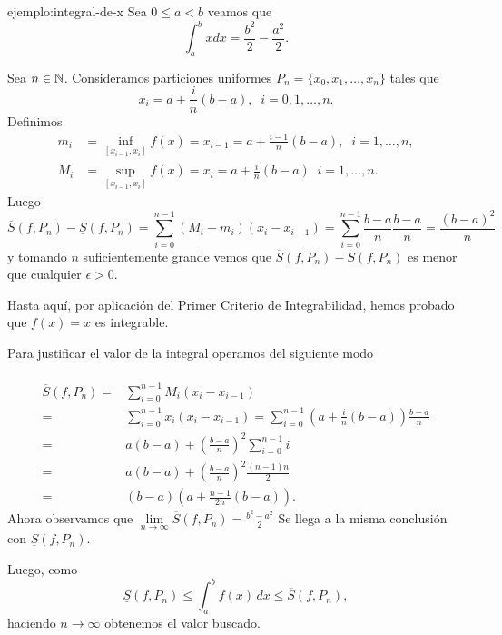 \begin{ejemplo}{ejemplo:integral-de-x} Sea $0\leq a<b$ veamos que 
\[
 \int_a^b x dx=\frac{b^2}{2}-\frac{a^2}{2}.
\]
\begin{demo}
Sea $n \in \mathbb{N}$.
Consideramos particiones uniformes $P_n=\{x_0,x_1,\ldots,x_n\}$ tales que
\[x_i=a+\frac{i}{n}(b-a),\;\;  i=0,1,\ldots,n.\]
Definimos
\[\begin{split}
m_i&=\inf\limits_{[x_{i-1},x_i]}f(x)=x_{i-1}=a+\frac{i-1}{n}(b-a),\;\;  i=1,\ldots,n,
\\
M_i&=\sup\limits_{[x_{i-1},x_i]}f(x)=x_{i}=a+\frac{i}{n}(b-a)\;\;  i=1,\ldots,n.
\end{split}\]
Luego
\[
\overline{S}(f,P_n)-\underline{S}(f,P_n)=
\sum\limits_{i=0}^{n-1} (M_i-m_i)(x_i-x_{i-1})=
\sum\limits_{i=0}^{n-1}  
\frac{b-a}{n}\frac{b-a}{n}=\frac{(b-a)^2}{n}
\]
y tomando $n$ suficientemente grande vemos que $\overline{S}(f,P_n)-\underline{S}(f,P_n)$ es menor que cualquier $\epsilon>0$.

Hasta aqu\'i, por aplicaci\'on del Primer Criterio de Integrabilidad,  hemos probado que $f(x)=x$ es integrable. 

Para justificar el valor de la integral operamos del siguiente modo

\paragraph{}

\[
\begin{split}
\overline{S}(f,P_n)=&
\sum\limits_{i=0}^{n-1} M_i(x_i-x_{i-1})
\\
=&\sum\limits_{i=0}^{n-1} x_i(x_i-x_{i-1})=\sum\limits_{i=0}^{n-1}
\left(a+\frac{i}{n}(b-a) \right)\frac{b-a}{n}
\\
=&a(b-a)+\left(\frac{b-a}{n} \right)^2\sum\limits_{i=0}^{n-1} i
\\
=& a(b-a)+\left(\frac{b-a}{n} \right)^2 \frac{(n-1)n}{2}
\\
=&(b-a)\left(a+\frac{n-1}{2n} (b-a)\right).
\end{split}
\]
Ahora observamos que 
$\lim\limits_{n \to \infty} \overline{S}(f,P_n)=\frac{b^2-a^2}{2}$
Se llega a la misma conclusi\'on con $\underline{S}(f,P_n)$.

Luego, como 
\[
\underline{S}(f,P_n)\leq \int_a^b f(x)\,dx \leq \overline{S}(f,P_n),
\]
haciendo $n \to \infty$ obtenemos el valor buscado.
\end{demo}



\end{ejemplo}


